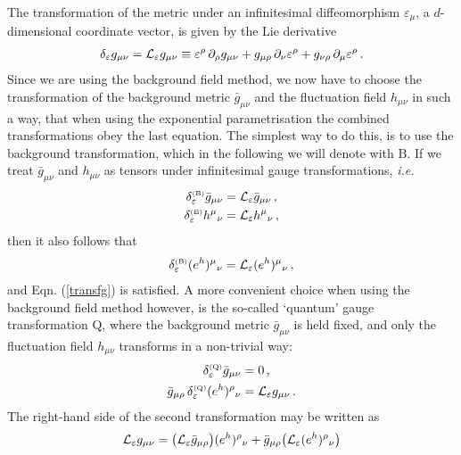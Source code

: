 \documentclass[11pt]{book}
\newcommand\ie{\textit{i.e.}\ }
\newcommand{\Lie}{{\cal L}}
\numberwithin{equation}{chapter}
\begin{document}
\begin{appendices}
The transformation of the metric under an infinitesimal diffeomorphism $\varepsilon_\mu$,
a $d$-dimensional coordinate vector, is given by the Lie derivative
\begin{align}
  \delta_\varepsilon g_{\mu\nu} =
  \Lie_\varepsilon   g_{\mu\nu}
  \equiv
   \varepsilon^\rho \, \partial_\rho g_{\mu\nu}
  +g_{\mu\rho} \, \partial_\nu \varepsilon^\rho
  +g_{\nu\rho} \, \partial_\mu \varepsilon^\rho \,.
  \label{transfg}
\end{align}
Since we are using the background field method,
we now have to choose the transformation of the background metric
$\bar g_{\mu\nu}$ and the fluctuation field $h_{\mu\nu}$ in such a way,
that when using the exponential parametrisation the
combined transformations obey the last equation.
The simplest way to do this, is to use the background transformation,
which in the following we will denote with $\mathrm B$.
If we treat $\bar g_{\mu\nu}$ and $h_{\mu\nu}$ as tensors under
infinitesimal gauge transformations, \ie
\begin{align}
  \delta^{\scriptscriptstyle{(\mathrm B)}}_\varepsilon \bar g_{\mu\nu}
  &= \Lie_\varepsilon \bar g_{\mu\nu} \,, \\
  \delta^{\scriptscriptstyle{(\mathrm B)}}_\varepsilon h^\mu{}_\nu
  &= \Lie_\varepsilon h^\mu{}_\nu \,,
\end{align}
then it also follows that
\begin{align}
  \delta^{\scriptscriptstyle{(\mathrm B)}}_\varepsilon (e^h)^\mu{}_\nu
  = \Lie_\varepsilon (e^h)^\mu{}_\nu \,,
\end{align}
and Eqn. (\ref{transfg}) is satisfied.
A more convenient choice when using the background field method
however, is the so-called `quantum' gauge transformation $\mathrm Q$,
where the background metric $\bar g_{\mu\nu}$ is held fixed, and only
the fluctuation field $h_{\mu\nu}$ transforms in a non-trivial way:
\begin{align}
  \delta^{\scriptscriptstyle{(\mathrm Q)}}_\varepsilon \bar g_{\mu\nu} &= 0 \,, \\
  \bar g_{\mu\rho} \, \delta^{\scriptscriptstyle{(\mathrm Q)}}_\varepsilon
  (e^h)^\rho{}_\nu &= \Lie_\varepsilon g_{\mu\nu} \,.
\end{align}
The right-hand side of the second transformation may be written as
\begin{align}
  \Lie_\varepsilon g_{\mu\nu}
  &= \big( \Lie_\varepsilon \bar g_{\mu\rho} \big) (e^h)^\rho{}_\nu
  + \bar g_{\mu\rho} \big( \Lie_\varepsilon (e^h)^\rho{}_\nu \big) \nonumber \\

\end{align}
\end{appendices}
\end{document}
